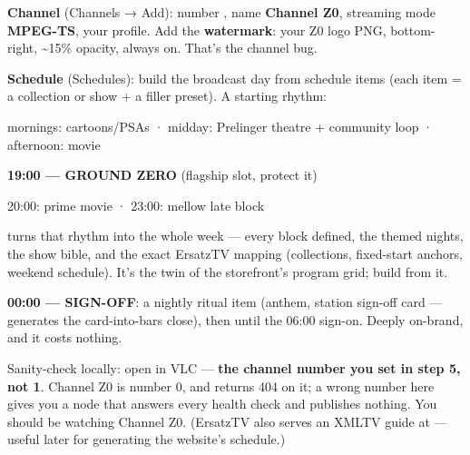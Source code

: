 \documentclass[fontpath=fonts/,logopath=logo/]{riposte-doc}
\begin{document}
\begin{ripnumbers}
\item \textbf{Channel} (Channels → Add): number , name \textbf{Channel Z0}, streaming mode \textbf{MPEG-TS}, your  profile. Add the \textbf{watermark}: your Z0 logo PNG, bottom-right, \textasciitilde{}15\% opacity, always on. That's the channel bug.
\item \textbf{Schedule} (Schedules): build the broadcast day from schedule items (each item = a collection or show + a filler preset). A starting rhythm:
\begin{ripbullets}
\item mornings: cartoons/PSAs · midday: Prelinger theatre + community loop · afternoon: movie
\item \textbf{19:00 — GROUND ZERO} (flagship slot, protect it)
\item 20:00: prime movie · 23:00: mellow late block
\item \ripmarker{}   turns that rhythm into the whole week — every block defined, the themed nights, the show bible, and the exact ErsatzTV mapping (collections, fixed-start anchors, weekend schedule). It's the twin of the storefront's program grid; build from it.
\item \textbf{00:00 — SIGN-OFF}: a nightly ritual item (anthem, station sign-off card —  generates the card-into-bars close), then  until the 06:00 sign-on. Deeply on-brand, and it costs nothing.
\end{ripbullets}

\item Sanity-check locally: open  in VLC — \textbf{the channel number you set in step 5, not 1}. Channel Z0 is number 0, and  returns 404 on it; a wrong number here gives you a node that answers every health check and publishes nothing. You should be watching Channel Z0. (ErsatzTV also serves an XMLTV guide at  — useful later for generating the website's schedule.)
\end{ripnumbers}


\end{document}
